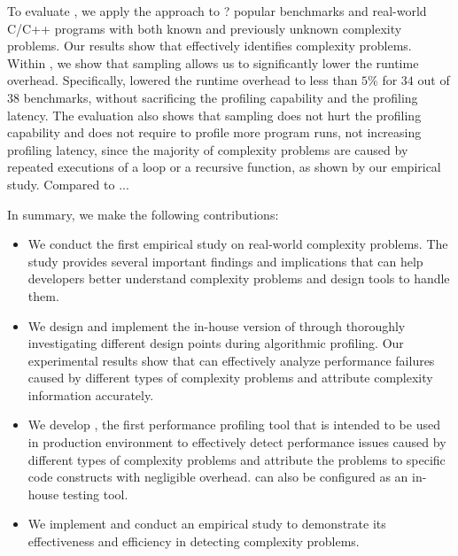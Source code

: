 To evaluate \Tool, we apply the approach to ? popular benchmarks and real-world 
C/C++ programs with both known and previously unknown complexity 
problems.  Our results show that  \Tool effectively identifies complexity
problems.  Within \Tool, we show that 
sampling allows us to significantly lower the runtime overhead.
Specifically, \Tool  lowered the runtime overhead to less than
$5\%$ for $34$ out of $38$ benchmarks,
without sacrificing the profiling capability and the profiling latency.
The evaluation also shows that sampling does not hurt the profiling capability
and does not require to profile more program runs,
not increasing profiling latency, since
the majority of complexity problems are caused by
repeated executions of a loop or a recursive function, as shown by our empirical study.
Compared to ... 


In summary, we make the following contributions:

\begin{itemize}

\item We conduct the first empirical study on real-world complexity problems.
The study provides several important findings and implications that can
help developers better understand complexity problems and design tools
to handle them. 


\item We design and implement the in-house version of \Tool through
thoroughly investigating different design points during algorithmic profiling.
Our experimental results show that \Tool can effectively analyze performance failures
caused by different types of complexity problems and attribute complexity information accurately.

\fi

\item We develop   \Tool, the first performance profiling tool that is intended to be used
in production environment to effectively detect performance
issues caused by different types of complexity problems and attribute the 
problems to specific code constructs with negligible
overhead.  
\Tool can also be configured as an in-house testing tool. 

\item We implement \Tool and conduct an empirical study to demonstrate 
its effectiveness and efficiency in detecting complexity problems. 



\end{itemize}
